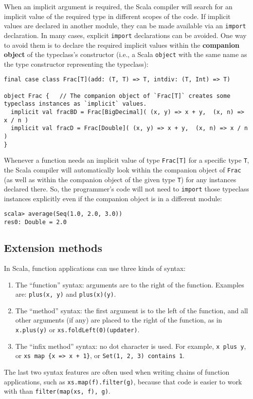 When an implicit argument is required, the Scala compiler will search
for an implicit value of the required type in different scopes of
the code. If implicit values are declared in another module, they
can be made available via an \lstinline!import! declaration. In many
cases, explicit \lstinline!import! declarations can be avoided. One
way to avoid them is to declare the required implicit values within
the \textbf{companion object} of the typeclass\textsf{'}s
constructor (i.e., a Scala \lstinline!object! with the same name
as the type constructor representing the typeclass):
\begin{lstlisting}
final case class Frac[T](add: (T, T) => T, intdiv: (T, Int) => T)

object Frac {   // The companion object of `Frac[T]` creates some typeclass instances as `implicit` values.
  implicit val fracBD = Frac[BigDecimal]( (x, y) => x + y,  (x, n) => x / n )
  implicit val fracD = Frac[Double]( (x, y) => x + y,  (x, n) => x / n )
}
\end{lstlisting}
Whenever a function needs an implicit value of type \lstinline!Frac[T]!
for a specific type \lstinline!T!, the Scala compiler will automatically
look within the companion object of \lstinline!Frac! (as well as
within the companion object of the given type \lstinline!T!) for
any instances declared there. So, the programmer\textsf{'}s code will not need
to \lstinline!import! those typeclass instances explicitly even if
the companion object is in a different module:
\begin{lstlisting}
scala> average(Seq(1.0, 2.0, 3.0))
res0: Double = 2.0
\end{lstlisting}


\subsection{Extension methods}

In Scala, function applications can use three kinds of syntax: 
\begin{enumerate}
\item The \textsf{``}function\textsf{''} syntax: arguments are to the right of the function.
Examples are: \lstinline!plus(x, y)! and \lstinline!plus(x)(y)!.
\item The \textsf{``}method\textsf{''} syntax: the first argument is to the left of the
function, and all other arguments (if any) are placed to the right
of the function, as in \lstinline!x.plus(y)! or \lstinline!xs.foldLeft(0)(updater)!.
\item The \textsf{``}infix method\textsf{''} syntax: no dot character is used. For example,
\lstinline!x plus y!, or \lstinline!xs map {x => x + 1}!, or \lstinline!Set(1, 2, 3) contains 1!.
\end{enumerate}
The last two syntax features are often used when writing chains of
function applications, such as \lstinline!xs.map(f).filter(g)!, because
that code is easier to work with than \lstinline!filter(map(xs, f), g)!. 

